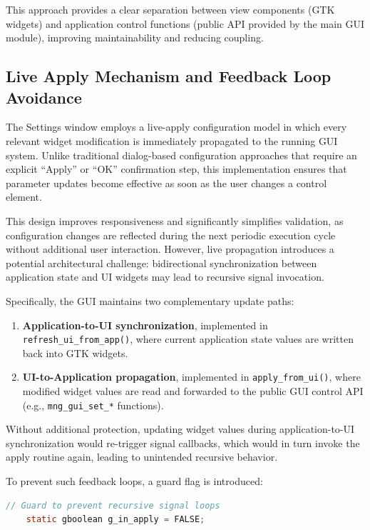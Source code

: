 This approach provides a clear separation between view components (GTK widgets) and application control functions (public API provided by the main GUI module), improving maintainability and reducing coupling.

\subsection{Live Apply Mechanism and Feedback Loop Avoidance}
\label{sec:gui_live_apply}

The Settings window employs a live-apply configuration model in which every relevant widget modification is immediately propagated to the running GUI system. Unlike traditional dialog-based configuration approaches that require an explicit ``Apply'' or ``OK'' confirmation step, this implementation ensures that parameter updates become effective as soon as the user changes a control element.

This design improves responsiveness and significantly simplifies validation, as configuration changes are reflected during the next periodic execution cycle without additional user interaction. However, live propagation introduces a potential architectural challenge: bidirectional synchronization between application state and UI widgets may lead to recursive signal invocation.

Specifically, the GUI maintains two complementary update paths:

\begin{enumerate}
	\item \textbf{Application-to-UI synchronization}, implemented in \texttt{refresh\_ui\_from\_app()}, where current application state values are written back into GTK widgets.
	\item \textbf{UI-to-Application propagation}, implemented in \texttt{apply\_from\_ui()}, where modified widget values are read and forwarded to the public GUI control API (e.g., \texttt{mng\_gui\_set\_*} functions).
\end{enumerate}

Without additional protection, updating widget values during application-to-UI synchronization would re-trigger signal callbacks, which would in turn invoke the apply routine again, leading to unintended recursive behavior.

To prevent such feedback loops, a guard flag is introduced:

\begin{lstlisting}[language=C]
	// Guard to prevent recursive signal loops
	static gboolean g_in_apply = FALSE;
\end{lstlisting}

